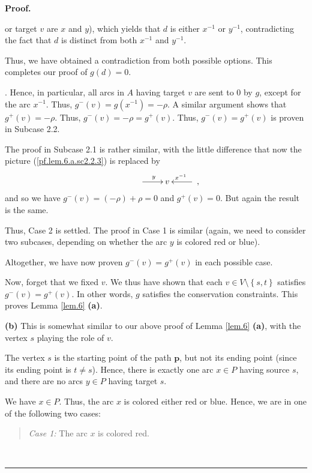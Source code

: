 \documentclass[numbers=enddot,12pt,final,onecolumn,notitlepage]{scrartcl}%
\theoremstyle{definition}
\newenvironment{statement}{\begin{quote}}{\end{quote}}
\newenvironment{proof}[1][Proof]{\noindent\textbf{#1.} }{\ \rule{0.5em}{0.5em}}
\begin{document}
\begin{proof}
{or target $v$ are $x$ and $y$), which yields that $d$ is either $x^{-1}$ or
$y^{-1}$, contradicting the fact that $d$ is distinct from both $x^{-1}$ and
$y^{-1}$.
\par
Thus, we have obtained a contradiction from both possible options. This
completes our proof of $g\left(  d\right)  =0$.}. Hence, in particular, all
arcs in $A$ having target $v$ are sent to $0$ by $g$, except for the arc
$x^{-1}$. Thus, $g^{-}\left(  v\right)  =g\left(  x^{-1}\right)  =-\rho$. A
similar argument shows that $g^{+}\left(  v\right)  =-\rho$. Thus,
$g^{-}\left(  v\right)  =-\rho=g^{+}\left(  v\right)  $. Thus, $g^{-}\left(
v\right)  =g^{+}\left(  v\right)  $ is proven in Subcase 2.2.

The proof in Subcase 2.1 is rather similar, with the little difference that
now the picture (\ref{pf.lem.6.a.sc2.2.3}) is replaced by%
\[%
\xymatrix{
& \ar[r]^y & v & \ar[l]_{x^{-1}}
}%
,
\]
and so we have $g^{-}\left(  v\right)  =\left(  -\rho\right)  +\rho=0$ and
$g^{+}\left(  v\right)  =0$. But again the result is the same.

Thus, Case 2 is settled. The proof in Case 1 is similar (again, we need to
consider two subcases, depending on whether the arc $y$ is colored red or blue).

Altogether, we have now proven $g^{-}\left(  v\right)  =g^{+}\left(  v\right)
$ in each possible case.

Now, forget that we fixed $v$. We thus have shown that each $v\in
V\setminus\left\{  s,t\right\}  $ satisfies $g^{-}\left(  v\right)
=g^{+}\left(  v\right)  $. In other words, $g$ satisfies the conservation
constraints. This proves Lemma \ref{lem.6} \textbf{(a)}.

\textbf{(b)} This is somewhat similar to our above proof of Lemma \ref{lem.6}
\textbf{(a)}, with the vertex $s$ playing the role of $v$.

The vertex $s$ is the starting point of the path $\mathbf{p}$, but not its
ending point (since its ending point is $t\neq s$). Hence, there is exactly
one arc $x\in P$ having source $s$, and there are no arcs $y\in P$ having
target $s$.

We have $x\in P$. Thus, the arc $x$ is colored either red or blue. Hence, we
are in one of the following two cases:

\begin{statement}
\textit{Case 1:} The arc $x$ is colored red.
\end{statement}


\end{proof}
\end{document}
